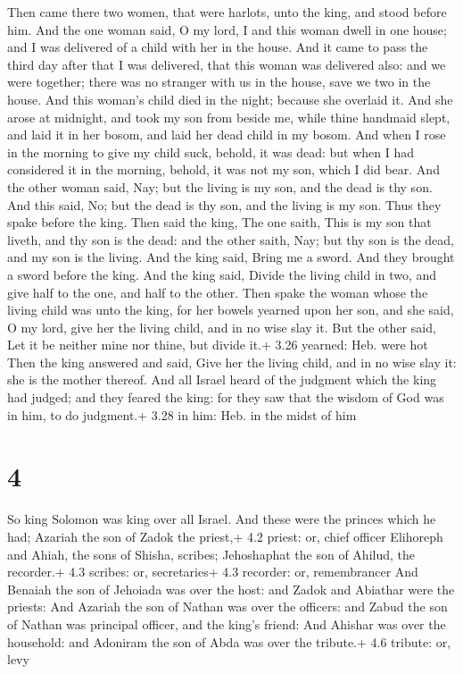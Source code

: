  Then came there two women, that were harlots, unto the
king, and stood before him.  And the one woman said, O my
lord, I and this woman dwell in one house; and I was delivered of a
child with her in the house.  And it came to pass the third
day after that I was delivered, that this woman was delivered also: and
we were together; there was no stranger with us in the house, save we
two in the house.  And this woman's child died in the
night; because she overlaid it.  And she arose at midnight,
and took my son from beside me, while thine handmaid slept, and laid it
in her bosom, and laid her dead child in my bosom.  And
when I rose in the morning to give my child suck, behold, it was dead:
but when I had considered it in the morning, behold, it was not my son,
which I did bear.  And the other woman said, Nay; but the
living is my son, and the dead is thy son. And this said, No; but the
dead is thy son, and the living is my son. Thus they spake before the
king.  Then said the king, The one saith, This is my son
that liveth, and thy son is the dead: and the other saith, Nay; but thy
son is the dead, and my son is the living.  And the king
said, Bring me a sword. And they brought a sword before the king.
 And the king said, Divide the living child in two, and
give half to the one, and half to the other.  Then spake
the woman whose the living child was unto the king, for her bowels
yearned upon her son, and she said, O my lord, give her the living
child, and in no wise slay it. But the other said, Let it be neither
mine nor thine, but divide it.+ 3.26 yearned: Heb. were hot
 Then the king answered and said, Give her the living
child, and in no wise slay it: she is the mother thereof. 
And all Israel heard of the judgment which the king had judged; and they
feared the king: for they saw that the wisdom of God was in him, to do
judgment.+ 3.28 in him: Heb. in the midst of him

\hypertarget{section-3}{%
\section{4}\label{section-3}}

 So king Solomon was king over all Israel.  And
these were the princes which he had; Azariah the son of Zadok the
priest,+ 4.2 priest: or, chief officer  Elihoreph and Ahiah,
the sons of Shisha, scribes; Jehoshaphat the son of Ahilud, the
recorder.+ 4.3 scribes: or, secretaries+ 4.3 recorder: or, remembrancer
 And Benaiah the son of Jehoiada was over the host: and
Zadok and Abiathar were the priests:  And Azariah the son of
Nathan was over the officers: and Zabud the son of Nathan was principal
officer, and the king's friend:  And Ahishar was over the
household: and Adoniram the son of Abda was over the tribute.+ 4.6
tribute: or, levy

